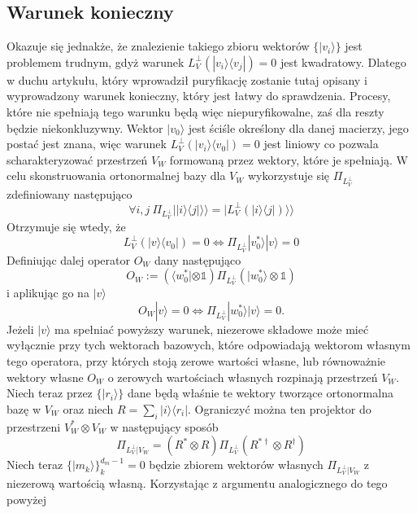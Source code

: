 \documentclass[10pt]{article} %
\newcommand{\Ket}[1]{|#1\rangle}
\newcommand{\Bra}[1]{\langle#1|}
\newcommand{\KKet}[1]{|#1\rangle\rangle}
\newcommand{\I}{\mathbb{1}}
\newcommand{\LPV}{{L^\perp_V}}
\begin{document}
\subsection{Warunek konieczny}
Okazuje się jednakże, że znalezienie takiego zbioru wektorów $\{ \Ket{v_i} \}$ jest problemem trudnym, gdyż warunek $L^\perp_V(\Ket{v_i}\Bra{v_j})=0$ jest kwadratowy. Dlatego w duchu artykułu, który wprowadził puryfikację 
zostanie tutaj opisany i wyprowadzony warunek konieczny, który jest łatwy do sprawdzenia. Procesy, które nie spełniają tego warunku będą więc niepuryfikowalne, zaś dla reszty będzie niekonkluzywny. Wektor $\Ket{v_0}$ jest ściśle określony dla danej macierzy, jego postać jest znana, więc 
warunek $\LPV(\Ket{v_i}\Bra{v_0}) = 0$ jest liniowy co pozwala scharakteryzować przestrzeń $V_W$ formowaną przez wektory, które je spełniają.
W celu skonstruowania ortonormalnej bazy dla $V_W$ wykorzystuje się $\Pi_\LPV$ zdefiniowany następująco
\begin{equation}
\forall i,j ~\Pi_\LPV \KKet{\Ket{i}\Bra{j}} = \KKet{\LPV(\Ket{i}\Bra{j})}
\end{equation}
Otrzymuje się wtedy, że
\begin{equation}
\LPV(\Ket{v}\Bra{v_0}) = 0 \iff \Pi_\LPV \Ket{v^*_0} \Ket{v} = 0
\end{equation}
Definiując dalej operator $O_W$ dany następująco
\begin{equation}
O_W:= \left(\Bra{w^*_0} \otimes \I\right) \Pi_\LPV \left( \Ket{w^*_0} \otimes \I\right)
\end{equation}
i aplikując go na $\Ket{v}$
\begin{equation}
O_W\Ket{v} = 0 \iff \Pi_\LPV \Ket{w^*_0} \Ket{v} = 0.
\end{equation}
Jeżeli $\Ket{v}$ ma spełniać powyższy warunek, niezerowe składowe może mieć wyłącznie przy tych wektorach bazowych, które odpowiadają wektorom własnym tego operatora, przy których stoją zerowe wartości własne, lub równoważnie wektory własne $O_W$ o zerowych wartościach własnych rozpinają przestrzeń $V_W$. Niech teraz przez $\{ \Ket{r_i}\}$ dane będą właśnie te wektory tworzące ortonormalna bazę w $V_W$ oraz niech $R = \sum_i \Ket{i}\Bra{r_i}$. Ograniczyć można ten projektor do przestrzeni $V^*_W \otimes V_W$ w następujący sposób
\begin{equation}
\Pi_{\LPV|V_W} = \left(R^* \otimes R \right) \Pi_\LPV \left(R^{*\dag} \otimes R^\dag \right)
\end{equation}
Niech teraz $\{ \Ket{m_k} \}^{d_m-1}_k=0$ będzie zbiorem wektorów własnych $\Pi_{\LPV|V_W}$ z niezerową wartością własną. Korzystając z argumentu analogicznego do tego powyżej 
\end{document}

